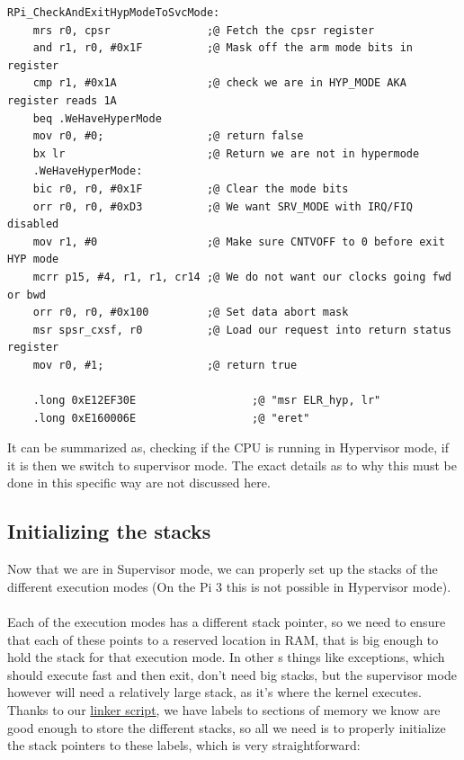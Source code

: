 \documentclass[12pt, svgnames]{book}
\begin{document}
\begin{lstlisting}[language=ASM, title={Code provided by \href{https://www.raspberrypi.org/forums/memberlist.php?mode=viewprofile&u=213434}{Leon de Boer}},captionpos=b]
	RPi_CheckAndExitHypModeToSvcMode:
	mrs r0, cpsr               ;@ Fetch the cpsr register             
	and r1, r0, #0x1F          ;@ Mask off the arm mode bits in register                            
	cmp r1, #0x1A              ;@ check we are in HYP_MODE AKA register reads 1A                     
	beq .WeHaveHyperMode
	mov r0, #0;                ;@ return false
	bx lr                      ;@ Return we are not in hypermode
	.WeHaveHyperMode:
	bic r0, r0, #0x1F          ;@ Clear the mode bits                   
	orr r0, r0, #0xD3          ;@ We want SRV_MODE with IRQ/FIQ disabled         
	mov r1, #0                 ;@ Make sure CNTVOFF to 0 before exit HYP mode
	mcrr p15, #4, r1, r1, cr14 ;@ We do not want our clocks going fwd or bwd
	orr r0, r0, #0x100         ;@ Set data abort mask    
	msr spsr_cxsf, r0          ;@ Load our request into return status register
	mov r0, #1;                ;@ return true
	
	.long 0xE12EF30E                  ;@ "msr ELR_hyp, lr"
	.long 0xE160006E                  ;@ "eret"   
\end{lstlisting}

It can be summarized as, checking if the CPU is running in Hypervisor mode, if it is then we switch to supervisor mode. The exact details as to why this must be done in this specific way are not discussed here.

\subsection{Initializing the stacks}

Now that we are in Supervisor mode, we can properly set up the stacks of the different execution modes (On the Pi 3 this is not possible in Hypervisor mode). 
\\~\\
Each of the execution modes has a different stack pointer, so we need to ensure that each of these points to a reserved location in RAM, that is big enough to hold the stack for that execution mode. In other s things like exceptions, which should execute fast and then exit, don't need big stacks, but the supervisor mode however will need a relatively large stack, as it's where the kernel executes. Thanks to our \hyperlink{linker script}{linker script}, we have labels to sections of memory we know are good enough to store the different stacks, so all we need is to properly initialize the stack pointers to these labels, which is very straightforward:
\end{document}
